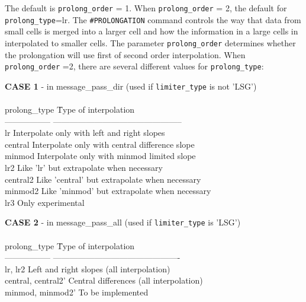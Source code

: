 The default is {\tt prolong\_order} = 1.  When {\tt prolong\_order} = 2,
the default for {\tt prolong\_type}=lr.
The {\tt \#PROLONGATION} command controls the way that data
from small cells is merged into a larger cell and how the 
information in a large cells in interpolated to smaller cells.
The parameter {\tt prolong\_order} determines whether the
prolongation will use first of second order interpolation.
When {\tt prolong\_order} =2,  there are several different 
values for {\tt prolong\_type}:
\begin{tabbing}
{\bf CASE 1} - in message\_pass\_dir (used if {\tt limiter\_type} is not 'LSG') \\
\\
prolong\_type \hspace{0.5in} \= Type of interpolation \\
-----------------            \> ----------------------------------------------- \\
lr		             \> Interpolate only with left and right slopes  \\
central	                     \> Interpolate only with central difference slope\\
minmod 	                     \> Interpolate only with minmod limited slope\\
lr2		             \> Like 'lr' but extrapolate when necessary\\
central2	             \> Like 'central' but extrapolate when necessary\\
minmod2	                     \> Like 'minmod' but extrapolate when necessary\\
lr3		             \> Only experimental
\end{tabbing}
\begin{tabbing}
{\bf CASE 2} - in message\_pass\_all (used if {\tt limiter\_type} is 'LSG') \\
\\
prolong\_type \hspace{0.5in} \= Type of interpolation \\
-----------------            \> ---------------------------------------------- \\
lr, lr2		             \> Left and right slopes (all interpolation) \\
central, central2'	     \> Central differences (all interpolation) \\
minmod, minmod2'	     \> To be implemented
\end{tabbing}
\ \ \\


